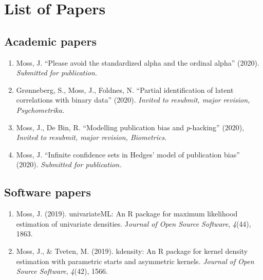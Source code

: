 \chapter{List of Papers}
\section*{Academic papers}
\begin{enumerate}

\item Moss, J. ``Please avoid the standardized alpha and the ordinal alpha''
(2020). \emph{Submitted for publication.}

\item Grønneberg, S., Moss, J., Foldnes, N. ``Partial identification of
latent correlations with binary data'' (2020). \emph{Invited to resubmit, major revision, Psychometrika.}

\item Moss, J., De Bin, R. ``Modelling publication bias and \emph{p}-hacking''
(2020), \emph{Invited to resubmit, major revision, Biometrics.}

\item Moss, J. ``Infinite confidence sets in Hedges' model of publication
bias'' (2020). \emph{Submitted for publication.}

\end{enumerate}

\section*{Software papers}
\begin{enumerate}
\item Moss, J. (2019). univariateML: An R package for maximum likelihood
estimation of univariate densities. J\emph{ournal of Open Source Software},
\emph{4}(44), 1863.
\item Moss, J., \& Tveten, M. (2019). kdensity: An R package for kernel
density estimation with parametric starts and asymmetric kernels.
\emph{Journal of Open Source Software}, \emph{4}(42), 1566.
\end{enumerate}
